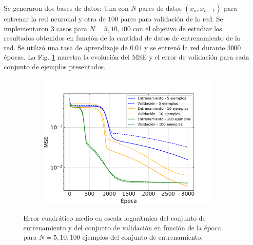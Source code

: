 \documentclass[11pt,twocolumn,twoside]{opticajnl}
\begin{document}
Se generaron dos bases de datos: Una con $N$ pares de datos $(x_n, x_{n+1})$ para entrenar la red neuronal y otra de $100$ pares para validación de la red. Se implementaron 3 casos para $N=5,10,100$ con el objetivo de estudiar los resultados obtenidos en función de la cantidad de datos de entrenamiento de la red. Se utilizó una tasa de aprendizaje de $0.01$ y se entrenó la red durante $3000$ épocas. La Fig. \ref{fig:mse_3} muestra la evolución del MSE y el error de validación para cada conjunto de ejemplos presentados. 
 
\begin{figure}[ht]
    \centering
         \begin{subfigure}[b]{\linewidth}
            \includegraphics[width=\textwidth]{Figuras/mse_ej3.pdf}
         \end{subfigure}
    \caption{Error cuadrático medio en escala logarítmica del conjunto de entrenamiento y del conjunto de validación en función de la época para $N=5,10,100$ ejemplos del conjunto de entrenamiento.} 
    \label{fig:mse_3}
\end{figure}
\end{document}
